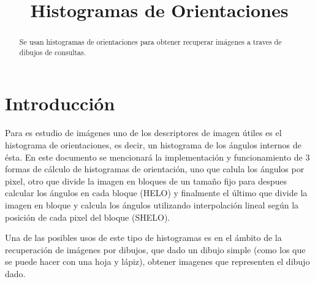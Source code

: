 \documentclass[conference]{IEEEtran}
\begin{document}
\title{Histogramas de Orientaciones}
\author{
}


\maketitle

\begin{abstract}
    Se usan histogramas de orientaciones para obtener recuperar imágenes a traves de dibujos de consultas.
\end{abstract}
 

\section*{Introducción} %
    Para es estudio de imágenes uno de los descriptores de imagen útiles es el histograma de orientaciones, es decir, un histograma de los ángulos internos de ésta. En este documento se mencionará la implementación y funcionamiento de 3 formas de cálculo de histogramas de orientación, uno que calula los ángulos por pixel, otro que divide la imagen en bloques de un tamaño fijo para despues calcular los ángulos en cada bloque (HELO) y finalmente el último que divide la imagen en bloque y calcula los ángulos utilizando interpolación lineal según la posición de cada pixel del bloque (SHELO).
    
    Una de las posibles usos de este tipo de histogramas es en el ámbito de la recuperación de imágenes por dibujos, que dado un dibujo simple (como los que se puede hacer con una hoja y lápiz), obtener imagenes que representen el dibujo dado.
    
\end{document}
